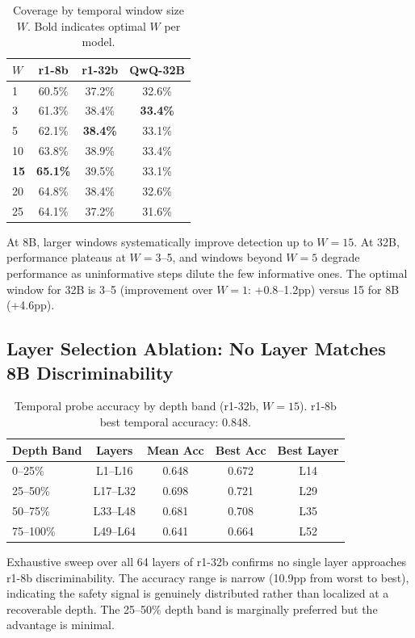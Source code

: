 \documentclass[11pt]{article}
\begin{document}
\begin{table}[h]
\centering
\caption{Coverage by temporal window size $W$. Bold indicates optimal $W$ per model.}
\label{tab:window}
\small
\begin{tabular}{lccc}
\toprule
$W$ & r1-8b & r1-32b & QwQ-32B \\
\midrule
1 & 60.5\% & 37.2\% & 32.6\% \\
3 & 61.3\% & 38.4\% & \textbf{33.4\%} \\
5 & 62.1\% & \textbf{38.4\%} & 33.1\% \\
10 & 63.8\% & 38.9\% & 33.4\% \\
\textbf{15} & \textbf{65.1\%} & 39.5\% & 33.1\% \\
20 & 64.8\% & 38.4\% & 32.6\% \\
25 & 64.1\% & 37.2\% & 31.6\% \\
\bottomrule
\end{tabular}
\end{table}

At 8B, larger windows systematically improve detection up to $W{=}15$. At 32B, performance plateaus at $W{=}3$--5, and windows beyond $W{=}5$ degrade performance as uninformative steps dilute the few informative ones. The optimal window for 32B is 3--5 (improvement over $W{=}1$: +0.8--1.2pp) versus 15 for 8B (+4.6pp).

\subsection{Layer Selection Ablation: No Layer Matches 8B Discriminability}

\begin{table}[h]
\centering
\caption{Temporal probe accuracy by depth band (r1-32b, $W{=}15$). r1-8b best temporal accuracy: 0.848.}
\label{tab:layer_depth}
\small
\begin{tabular}{lcccc}
\toprule
Depth Band & Layers & Mean Acc & Best Acc & Best Layer \\
\midrule
0--25\% & L1--L16 & 0.648 & 0.672 & L14 \\
25--50\% & L17--L32 & 0.698 & 0.721 & L29 \\
50--75\% & L33--L48 & 0.681 & 0.708 & L35 \\
75--100\% & L49--L64 & 0.641 & 0.664 & L52 \\
\bottomrule
\end{tabular}
\end{table}

Exhaustive sweep over all 64 layers of r1-32b confirms no single layer approaches r1-8b discriminability. The accuracy range is narrow (10.9pp from worst to best), indicating the safety signal is genuinely distributed rather than localized at a recoverable depth. The 25--50\% depth band is marginally preferred but the advantage is minimal.
\end{document}
